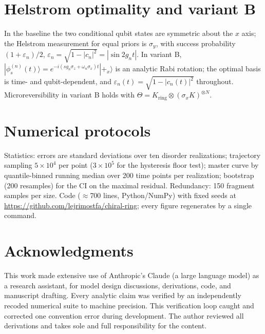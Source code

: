 \documentclass[11pt]{article}
\begin{document}
\section{Helstrom optimality and variant B}\label{app:helstrom}
In the baseline the two conditional qubit states are symmetric about the $x$ axis; the Helstrom measurement for equal priors is $\sigma_y$, with success probability $(1+\varepsilon_n)/2$, $\varepsilon_n=\sqrt{1-|c_n|^2}=|\sin 2g_nt|$. In variant B, $|\phi_s^{(n)}(t)\rangle = e^{-i(sg_n\sigma_z+\omega_n\sigma_x)t}|+_x\rangle$ is an analytic Rabi rotation; the optimal basis is time- and qubit-dependent, and $\varepsilon_n(t)=\sqrt{1-|c_n(t)|^2}$ throughout. Microreversibility in variant B holds with $\Theta=K_{\mathrm{ring}}\otimes(\sigma_xK)^{\otimes N}$.

\section{Numerical protocols}\label{app:numerics}
Statistics: errors are standard deviations over ten disorder realizations; trajectory sampling $5\times10^4$ per point ($3\times10^5$ for the hysteresis floor test); master curve by quantile-binned running median over 200 time points per realization; bootstrap (200 resamples) for the CI on the maximal residual. Redundancy: 150 fragment samples per size. Code ($\approx$700 lines, Python/NumPy) with fixed seeds at \url{https://github.com/lejrimostfa/chiral-ring}; every figure regenerates by a single command.


\section*{Acknowledgments}
This work made extensive use of Anthropic's Claude (a large language model) as a research assistant, for model design discussions, derivations, code, and manuscript drafting. Every analytic claim was verified by an independently recoded numerical suite to machine precision. This verification loop caught and corrected one convention error during development. The author reviewed all derivations and takes sole and full responsibility for the content.
\end{document}
